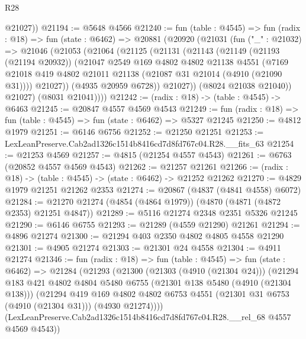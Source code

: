 \begin{lexlean}{R28}
\begin{coremodule}
        @21027))
@21194 := @5648 @4566
@21240 := fun (table : @4545) =>
  fun (radix : @18) =>
  fun (state : @6462) =>
  @20881
    (@20920
      (@21031
        (fun ("_" : @21032) =>
        @21046
          (@21053
            (@21064
              (@21125
                (@21131
                  (@21143
                    (@21149
                      (@21193 (@21194 @20932))
                      (@21047
                        @2549
                        @169
                        @4802
                        @4802
                        @21138
                        @4551
                        (@7169
                          @21018
                          @419
                          @4802
                          @21011
                          @21138
                          (@21087 @31 @21014 (@4910 (@21090 @31))))
                        @21027))
                    (@4935 @20959 @6728))
                  @21027))
              (@8024 @21038 @21040))
            @21027)
          (@8031 @21041))))
@21242 := (radix : @18) -> (table : @4545) -> @6463
@21245 := @20847 @4557 @4569 @4543
@21249 := fun (radix : @18) => fun (table : @4545) => fun (state : @6462) => @5327 @21245
@21250 := @4812 @1979
@21251 := @6146 @6756
@21252 := @21250 @21251
@21253 := LexLeanPreserve.Cab2ad1326c1514b8416cd7d8fd767c04.R28.__fits_63
@21254 := @21253 @4569
@21257 := @4815 (@21254 @4557 @4543)
@21261 := @6763 (@20852 @4557 @4569 @4543)
@21262 := @21257 @21261
@21266 := (radix : @18) -> (table : @4545) -> (state : @6462) -> @21252 @21262
@21270 := @4829 @1979 @21251 @21262 @2353
@21274 := @20867 (@4837 (@4841 @4558) @6072)
@21284 := @21270 @21274 (@4854 (@4864 @1979)) (@4870 (@4871 (@4872 @2353) @21251 @4847))
@21289 := @5116 @21274 @2348 @2351 @5326 @21245
@21290 := @6146 @6755
@21293 := @21289 (@4559 @21290) @21261
@21294 := @4896 @21274
@21300 := @21294 @403 @2350 @4802 @4805 @4558 @21290
@21301 := @4905 @21274
@21303 := @21301 @24 @4558
@21304 := @4911 @21274
@21346 := fun (radix : @18) =>
  fun (table : @4545) =>
  fun (state : @6462) =>
  @21284
    (@21293
      (@21300
        (@21303 (@4910 (@21304 @24)))
        (@21294
          @183
          @421
          @4802
          @4804
          @5480
          @6755
          (@21301 @138 @5480 (@4910 (@21304 @138)))
          (@21294
            @419
            @169
            @4802
            @4802
            @6753
            @4551
            (@21301 @31 @6753 (@4910 (@21304 @31)))
            (@4930 @21274))))
      (LexLeanPreserve.Cab2ad1326c1514b8416cd7d8fd767c04.R28.__rel_68 @4557 @4569 @4543))

\end{coremodule}
\end{lexlean}
